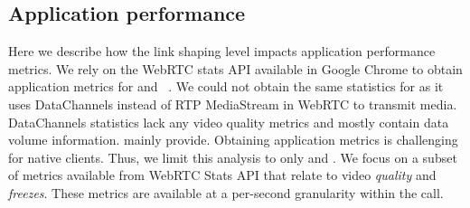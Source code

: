 
\subsection{Application performance}
\label{subsec:application_performance}
Here we describe how the link shaping level impacts application performance metrics. %
We rely on the WebRTC stats API available in Google Chrome to obtain application metrics for \teamsbrowser and \meet~\cite{webrtc_stats}. We could not obtain the same statistics for \zoombrowser as it uses DataChannels instead of RTP MediaStream in WebRTC to transmit media. DataChannels statistics lack any video quality metrics and mostly contain data volume information. mainly provide. Obtaining application metrics is challenging for native clients.  %
Thus, we limit this analysis to only \meet and \teamsbrowser. We focus on a subset of metrics available from WebRTC Stats API that relate to video \textit{quality} and \textit{freezes}. These metrics are available at a per-second granularity within the call. %


